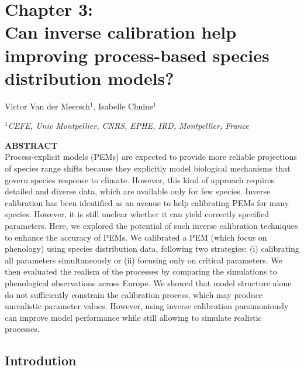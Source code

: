 
\section{Chapter 3:\\ Can inverse calibration help improving process-based species distribution models?}
\label{chapter3}

\vspace*{1cm}
\sffamily
\large
\begin{center}
Victor Van der Meersch$^1$, Isabelle Chuine$^1$

\vspace*{0.1cm}
\small
\emph{$^1$CEFE, Univ Montpellier, CNRS, EPHE, IRD, Montpellier, France}
\end{center}

\vspace*{0.7cm}
\normalsize

\vspace*{1.5cm}

\textbf{ABSTRACT}\\
Process-explicit models (PEMs) are expected to provide more reliable projections of species range shifts because they explicitly model biological mechanisms that govern species response to climate.
However, this kind of approach requires detailed and diverse data, which are available only for few species. 
Inverse calibration has been identified as an avenue to help calibrating PEMs for many species. However, it is still unclear whether it can yield correctly specified parameters.
Here, we explored the potential of such inverse calibration techniques to enhance the accuracy of PEMs. We calibrated a PEM (which focus on phenology) using species distribution data, following two strategies: (i) calibrating all parameters simultaneously or (ii) focusing only on critical parameters. We then evaluated the realism of the processes by comparing the simulations to phenological observations across Europe. 
We showed that model structure alone do not sufficiently constrain the calibration process, which may produce unrealistic parameter values. However, using inverse calibration parsimoniously can improve model performance while still allowing to simulate realistic processes.


\rmfamily

\newpage

\subsection{Introdution}

